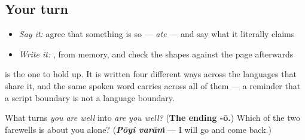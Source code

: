 \subsection*{Your turn}
\begin{itemize}
\raggedright
  \item \emph{Say it:} agree that something is so — \emph{ate} — and say what it literally claims
  \item \emph{Write it:} \textbf{}, from memory, and check the shapes against the page afterwards
\end{itemize}

\textbf{} is the one to hold up. It is written four different ways across the languages that share it, and the same spoken word carries across all of them — a reminder that a script boundary is not a language boundary.

\begin{tcolorbox}[breakable,colback=teal!4,colframe=teal!35!black,title={Before you move on}]
What turns \emph{you are well} into \emph{are you well?} (\textbf{The ending -ō.}) Which of the two farewells is about you alone? (\emph{\textbf{Pōyi varāṁ}} — I will go and come back.)
\end{tcolorbox}
